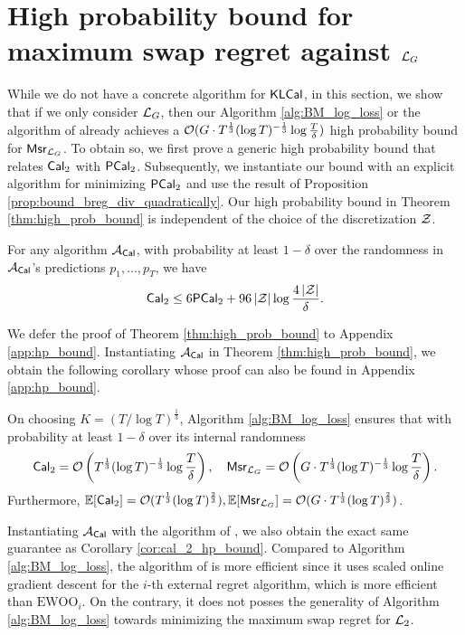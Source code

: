 \section{High probability bound for maximum swap regret against $\cL_{G}$}\label{sec:bound_calibration}
While we do not have a concrete algorithm for $\kcal$,
in this section, we show that if we only consider $\cL_{G}$, 
then our Algorithm \ref{alg:BM_log_loss} or the algorithm of \cite{fishelsonfull} already achieves a ${\cO}(G \cdot T^{\frac{1}{3}} (\log T) ^ {-\frac{1}{3}} \log \tfrac{T}{\delta})$ high probability bound for $\msr_{\cL_{G}}$. To obtain so, we first prove a generic high probability bound that relates $\cal_{2}$ with $\pcal_{2}$. Subsequently, we instantiate our bound with an explicit algorithm for minimizing $\pcal_{2}$ and use the result of Proposition \ref{prop:bound_breg_div_quadratically}. 
Our high probability bound in Theorem \ref{thm:high_prob_bound} is independent of the choice of the discretization $\cZ$. 


\begin{theorem}\label{thm:high_prob_bound}
    For any algorithm $\cA_{\cal}$, with probability at least $1 - \delta$ over the randomness in $\cA_{\cal}$'s predictions $p_{1}, \dots, p_{T}$, we have $$
        \cal_{2} \le 6 \pcal_{2} + 96 \abs{\cZ}\log \frac{4\abs{\cZ}}{\delta}.
    $$
\end{theorem}

We defer the proof of Theorem \ref{thm:high_prob_bound} to Appendix \ref{app:hp_bound}. Instantiating $\cA_{\cal}$ in Theorem \ref{thm:high_prob_bound}, we obtain the following corollary whose proof can also be found in Appendix \ref{app:hp_bound}.


\begin{corollary}\label{cor:cal_2_hp_bound}
On choosing $K = (T/\log T) ^ {\frac{1}{3}}$, Algorithm \ref{alg:BM_log_loss} ensures that with probability at least $1 - \delta$ over its internal randomness 
\begin{align*}
    \cal_{2} = \cO\bigc{{T ^ {\frac{1}{3}}}(\log T) ^ {-\frac{1}{3}} \log \frac{T}{\delta}}, \quad \msr_{\cL_{G}} = \cO\bigc{G \cdot {T ^ {\frac{1}{3}}}(\log T) ^ {-\frac{1}{3}} \log \frac{T}{\delta}}.
\end{align*}
Furthermore, $\mathbb{E}[\cal_{2}] = \cO(T^{\frac{1}{3}} (\log T) ^ {\frac{2}{3}}), \mathbb{E}[\msr_{\cL_{G}}] = \cO(G \cdot T^{\frac{1}{3}}(\log T) ^ {\frac{2}{3}})$.
\end{corollary}

Instantiating $\cA_{\cal}$ with the algorithm of \cite{fishelsonfull}, we also obtain the exact same guarantee as Corollary \ref{cor:cal_2_hp_bound}. Compared to Algorithm \ref{alg:BM_log_loss}, the algorithm of \cite{fishelsonfull} is more efficient since it uses scaled online gradient descent for the $i$-th external regret algorithm, which is more efficient than $\text{EWOO}_{i}$. On the contrary, it does not posses the generality of Algorithm \ref{alg:BM_log_loss} towards minimizing the maximum swap regret for $\cL_{2}$. 
